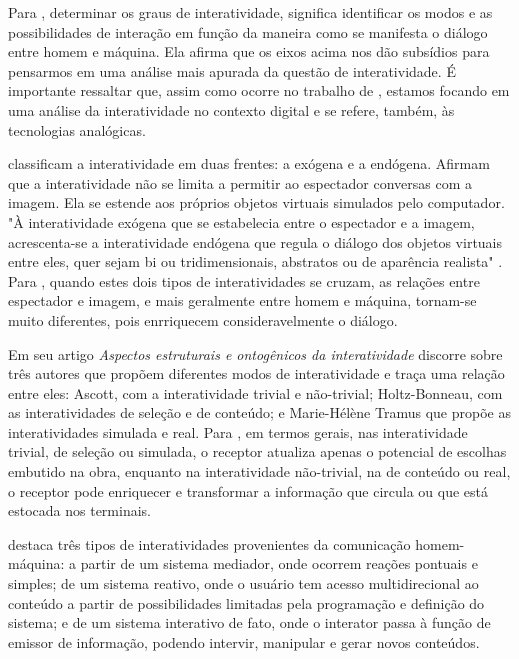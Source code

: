 Para , determinar os graus de interatividade, significa identificar os modos e as possibilidades de interação em função da maneira como se manifesta o diálogo entre homem e máquina. Ela afirma que os eixos acima nos dão subsídios para pensarmos em uma análise mais apurada da questão de interatividade. É importante ressaltar que, assim como ocorre no trabalho de , estamos focando em uma análise da interatividade no contexto digital e  se refere, também, às tecnologias analógicas.

 classificam a interatividade em duas frentes: a exógena e a endógena. Afirmam que a interatividade não se limita a permitir ao espectador conversas com a imagem. Ela se estende aos próprios objetos virtuais simulados pelo computador. "À interatividade exógena que se estabelecia entre o espectador e a imagem, acrescenta-se a interatividade endógena que regula o diálogo dos objetos virtuais entre eles, quer sejam bi ou tridimensionais, abstratos ou de aparência realista" \cite[p. 29]{couchot}. Para , quando estes dois tipos de interatividades se cruzam, as relações entre espectador e imagem, e mais geralmente entre homem e máquina, tornam-se muito diferentes, pois enrriquecem consideravelmente o diálogo. 

Em seu artigo \textit{Aspectos estruturais e ontogênicos da interatividade}  discorre sobre três autores que propõem diferentes modos de interatividade e traça uma relação entre eles: Ascott, com a interatividade trivial e não-trivial; Holtz-Bonneau, com  as interatividades de seleção e de conteúdo; e Marie-Hélène Tramus que propõe as interatividades simulada e real. Para , em termos gerais, nas interatividade trivial, de seleção ou simulada, o receptor atualiza apenas o potencial de escolhas embutido na obra, enquanto na interatividade não-trivial, na de conteúdo ou real, o receptor pode enriquecer e transformar a informação que circula ou que está estocada nos terminais. 

 destaca três tipos de interatividades provenientes da comunicação homem-máquina: a partir de um sistema mediador, onde ocorrem reações pontuais e simples; de um sistema reativo, onde o usuário tem acesso multidirecional ao conteúdo a partir de possibilidades limitadas pela programação e definição do sistema; e de um sistema interativo de fato, onde o interator passa à função de emissor de informação, podendo intervir, manipular e gerar novos conteúdos.  

